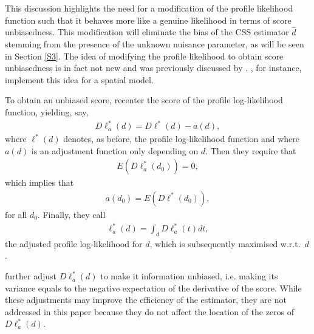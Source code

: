 {{This discussion highlights the need for a modification of the profile likelihood function such that it behaves more like a genuine likelihood in terms of score unbiasedness. This modification will eliminate the bias of
the CSS estimator $\hat d$ stemming from the presence of the unknown nuisance parameter, as will be seen in Section \ref{S3}. The idea of modifying the profile likelihood to obtain score unbiasedness is in fact not new
and was previously discussed by \textcite{mccullagh1990simple}. \textcite{martellosio2020adjusted}, for instance, implement this idea for a spatial model.

To obtain an unbiased score, \textcite{mccullagh1990simple} recenter the score of the profile log-likelihood function, yielding, say,
\begin{align}
    D  \ell^*_{a}(d) = D  \ell^*(d) - a(d),\label{tm21}
\end{align}
where $ \ell^*(d)$ denotes, as before, the profile log-likelihood function and where $a(d)$ is an adjustment function only depending on $d$. Then they require that 
\begin{align}
    E \left( D  \ell^*_{a}(d_0) \right) = 0, \label{tm1}
\end{align}
which implies that 
\begin{align}
    a(d_0) = E \left(  D  \ell^*(d_0)  \right), \label{tm3}
\end{align}
for all $d_0$.
Finally, they call 
\begin{align}
      \ell^*_{a}(d) = \int_{d}   D  \ell^*_{a}(t) dt, \label{tm2}
\end{align}
the adjusted profile log-likelihood for $d$, which is subsequently maximised w.r.t.\ $d$.

\begin{remark}
 \textcite{mccullagh1990simple} further adjust $D\ell^*_{a}(d)$ to make it information unbiased, i.e. making its variance equals to the negative expectation of the derivative of the score. While these adjustments may improve the efficiency of the estimator, they are not addressed in this paper because they do not affect the location of the zeros of $D\ell^*_{a}(d)$.
\end{remark}

}}
